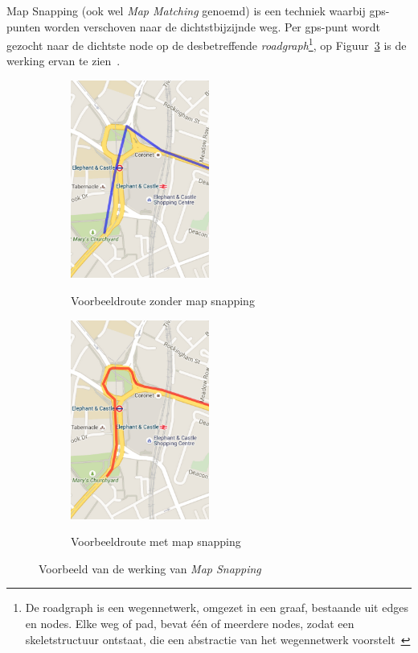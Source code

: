 Map Snapping (ook wel \textit{Map Matching} genoemd) is een techniek waarbij
\ac{gps}-punten worden verschoven naar de dichtstbijzijnde weg. Per
\ac{gps}-punt wordt gezocht naar de dichtste node op de desbetreffende
\textit{roadgraph}\footnote{De roadgraph is een wegennetwerk, omgezet in een
    graaf, bestaande uit edges en nodes. Elke weg of pad, bevat één of meerdere
    nodes, zodat een skeletstructuur ontstaat, die een abstractie van het
    wegennetwerk voorstelt~\cite{seiler2022haul}}, op Figuur~\ref{fig:MapSnapping}
is de werking ervan te zien~\cite{Snapping96:online}.
\begin{figure}[h]
    \centering
    \begin{subfigure}[b]{.5\textwidth}
        \centering
        \caption{Voorbeeldroute zonder map snapping}
        \includegraphics[width=0.5\textwidth]{fig/Map Snapping/before.png}\label{fig:before_MapSnapping}
    \end{subfigure}\hfill
    \begin{subfigure}[b]{.5\textwidth}
        \centering
        \caption{Voorbeeldroute met map snapping}
        \includegraphics[width=0.5\textwidth]{fig/Map Snapping/after.png}\label{fig:after_MapSnapping}
    \end{subfigure}
    \caption{Voorbeeld van de werking van \textit{Map Snapping}~\cite{Snapping96:online}}\label{fig:MapSnapping}
\end{figure}

